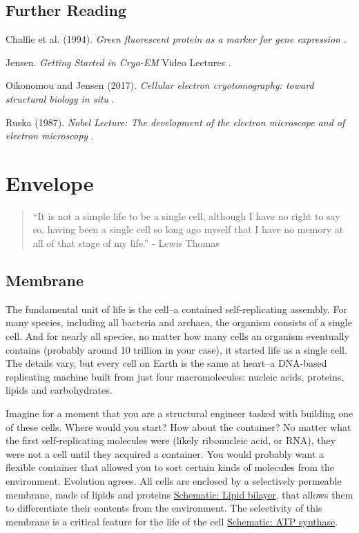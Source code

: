\documentclass[]{tufte-book}
\begin{document}
\section{Further Reading}\label{further-reading}

Chalfie et al. (1994). \emph{Green fluorescent protein as a marker for
gene expression} \citep{chalfie1994}.

Jensen. \emph{Getting Started in Cryo-EM} Video Lectures
\citep{jensenInternet}.

Oikonomou and Jensen (2017). \emph{Cellular electron cryotomography:
toward structural biology in situ} \citep{oikonomou2017}.

Ruska (1987). \emph{Nobel Lecture: The development of the electron
microscope and of electron microscopy} \citep{ruska1987}.

\chapter{Envelope}\label{envelope}

\begin{quote}
``It is not a simple life to be a single cell, although I have no right
to say so, having been a single cell so long ago myself that I have no
memory at all of that stage of my life.'' - Lewis Thomas
\citep{thomas1990}
\end{quote}

\section{Membrane}\label{membrane}

The fundamental unit of life is the cell--a contained self-replicating
assembly. For many species, including all bacteria and archaea, the
organism consists of a single cell. And for nearly all species, no
matter how many cells an organism eventually contains (probably around
10 trillion in your case), it started life as a single cell. The details
vary, but every cell on Earth is the same at heart--a DNA-based
replicating machine built from just four macromolecules: nucleic acids,
proteins, lipids and carbohydrates.

Imagine for a moment that you are a structural engineer tasked with
building one of these cells. Where would you start? How about the
container? No matter what the first self-replicating molecules were
(likely ribonucleic acid, or RNA), they were not a cell until they
acquired a container. You would probably want a flexible container that
allowed you to sort certain kinds of molecules from the environment.
Evolution agrees. All cells are enclosed by a selectively permeable
membrane, made of lipids and proteins
\protect\hyperlink{Lipid_bilayer}{Schematic: Lipid bilayer}, that allows
them to differentiate their contents from the environment. The
selectivity of this membrane is a critical feature for the life of the
cell \protect\hyperlink{ATP_synthase_and_energy_production}{Schematic:
ATP synthase}.
\end{document}
